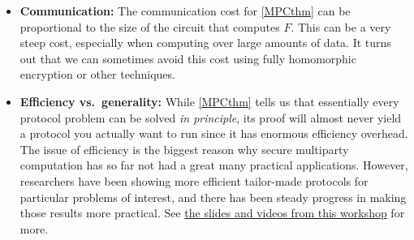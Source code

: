 \begin{itemize}
  \textbf{Concurrent compositions:} The definition displayed above are
  for \emph{standalone execution} which is known not to automatically
  imply security with respect to \emph{concurrent composition}, where
  many copies of the same protocol (or different protocols) could be
  executed simultaneously. This opens up all sorts of new
  attacks.\footnote{One example of the kind of issues that can arise is
    the ``grandmasters attack'' whereby someone with no knowledge of
    chess could play two grandmasters simultaneously, relaying their
    moves to one another and thereby guaranteeing a win in at least one
    of the games (or a draw in both).} See
  \href{http://u.cs.biu.ac.il/~lindell/thesis.html}{Yehuda Lindell's
  thesis} (or
  \href{http://u.cs.biu.ac.il/~lindell/LNCSmonograph.html}{this updated
  version}) for more. A very general notion known as ``UC security''
  (which stands for ``Universally Composable'' or maybe ``Ultimate
  Chuck'') has been proposed to achieve security in these settings,
  though at a price of additional setup assumptions, see
  \href{http://www.cs.tau.ac.il/~canetti/materials/ICALP08.pdf}{here}
  and \href{http://eprint.iacr.org/2007/475}{here}.
\item
  \textbf{Communication:} The communication cost for \cref{MPCthm} can
  be proportional to the size of the circuit that computes \(F\). This
  can be a very steep cost, especially when computing over large amounts
  of data. It turns out that we can sometimes avoid this cost using
  fully homomorphic encryption or other techniques.
\item
  \textbf{Efficiency vs.~generality:} While \cref{MPCthm} tells us that
  essentially every protocol problem can be solved \emph{in principle},
  its proof will almost never yield a protocol you actually want to run
  since it has enormous efficiency overhead. The issue of efficiency is
  the biggest reason why secure multiparty computation has so far not
  had a great many practical applications. However, researchers have
  been showing more efficient tailor-made protocols for particular
  problems of interest, and there has been steady progress in making
  those results more practical. See
  \href{http://crypto.biu.ac.il/5th-biu-winter-school}{the slides and
  videos from this workshop} for more.
\end{itemize}

